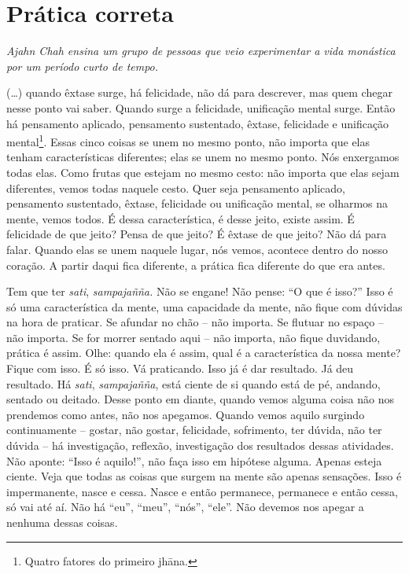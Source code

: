 
\chapter{Prática correta}

{\itshape
Ajahn Chah ensina um grupo de pessoas que veio experimentar a vida
monástica por um período curto de tempo.}

(…) quando êxtase surge, há felicidade, não dá para descrever, mas
quem chegar nesse ponto vai saber. Quando surge a felicidade,
unificação mental surge. Então há pensamento aplicado, pensamento
sustentado, êxtase, felicidade e unificação mental\footnote{Quatro
fatores do primeiro jhāna.}. Essas cinco coisas se unem no mesmo
ponto, não importa que elas tenham características diferentes; elas se
unem no mesmo ponto. Nós enxergamos todas elas. Como frutas que estejam
no mesmo cesto: não importa que elas sejam diferentes, vemos todas
naquele cesto. Quer seja pensamento aplicado, pensamento sustentado,
êxtase, felicidade ou unificação mental, se olharmos na mente, vemos
todos. É dessa característica, é desse jeito, existe assim. É
felicidade de que jeito? Pensa de que jeito? É êxtase de que jeito? Não
dá para falar. Quando elas se unem naquele lugar, nós vemos, acontece
dentro do nosso coração. A partir daqui fica diferente, a prática fica
diferente do que era antes.

Tem que ter \textit{sati}, \textit{sampajañña. }Não se engane! Não
pense: “O que é isso?” Isso é só uma característica da mente, uma
capacidade da mente, não fique com dúvidas na hora de praticar. Se
afundar no chão – não importa. Se flutuar no espaço – não importa. Se
for morrer sentado aqui – não importa, não fique duvidando, prática é
assim. Olhe: quando ela é assim, qual é a característica da nossa
mente? Fique com isso. É só isso. Vá praticando. Isso já é dar
resultado. Já deu resultado. Há \textit{sati}, \textit{sampajañña},
está ciente de si quando está de pé, andando, sentado ou deitado. Desse
ponto em diante, quando vemos alguma coisa não nos prendemos como
antes, não nos apegamos. Quando vemos aquilo surgindo continuamente –
gostar, não gostar, felicidade, sofrimento, ter dúvida, não ter dúvida
– há investigação, reflexão, investigação dos resultados dessas
atividades. Não aponte: “Isso é aquilo!”, não faça isso em hipótese
alguma. Apenas esteja ciente. Veja que todas as coisas que surgem na
mente são apenas sensações. Isso é impermanente, nasce e cessa. Nasce e
então permanece, permanece e então cessa, só vai até aí. Não há “eu”,
“meu”, “nós”, “ele”. Não devemos nos apegar a nenhuma dessas coisas. 

